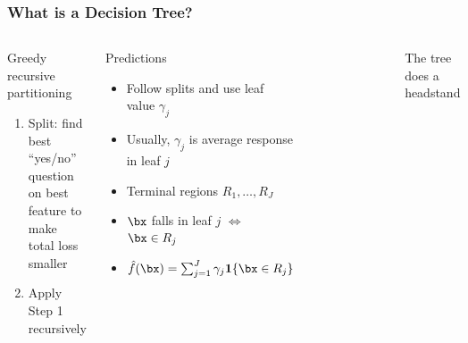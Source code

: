\begin{frame}
	\frametitle{What is a Decision Tree?}
	\begin{columns}[onlytextwidth]
		\begin{block}{Greedy recursive partitioning}
			\begin{enumerate}
				\item Split: find best ``yes/no'' question on best feature to make total loss smaller
				\item Apply Step 1 recursively
			\end{enumerate}
		\end{block}
		
		\begin{block}{Predictions}
			\begin{itemize}
				\item Follow splits and use leaf value $\gamma_j$
				\item Usually, $\gamma_j$ is average response in leaf $j$
				\item Terminal regions $R_1, \dots, R_J$
				\item $\bx$ falls in leaf $j$ $\Leftrightarrow$ $\bx \in R_j$
				\item $\hat f(\bx) = \sum_{j = 1}^{J} \gamma_j \boldsymbol 1\{\bx \in R_j\}$
			\end{itemize}
		\end{block}
		
		\begin{figure}
			\includegraphics[width=1\textwidth]{../figs/a_tree.png}
		\end{figure}
		\centering The tree does a headstand
		
		\begin{example}
		\end{example}
	\end{columns}
\end{frame}

